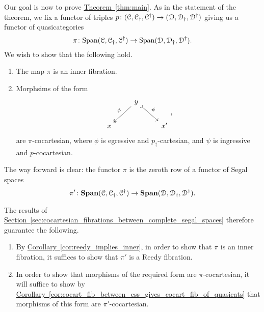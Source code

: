 \documentclass[main.tex]{subfiles}
\begin{document}
Our goal is now to prove \hyperref[thm:main]{Theorem~\ref*{thm:main}}. As in the statement of the theorem, we fix a functor of triples $p\colon (\mathcal{C}, \mathcal{C}_{\dagger}, \mathcal{C}^{\dagger}) \to (\mathcal{D}, \mathcal{D}_{\dagger}, \mathcal{D}^{\dagger})$ giving us a functor of quasicategories
\begin{equation*}
  \pi\colon \mathrm{Span}(\mathcal{C}, \mathcal{C}_{\dagger}, \mathcal{C}^{\dagger}) \to \mathrm{Span}(\mathcal{D}, \mathcal{D}_{\dagger}, \mathcal{D}^{\dagger}).
\end{equation*}
We wish to show that the following hold.
\begin{enumerate}
  \item The map $\pi$ is an inner fibration.

  \item Morphsims of the form
    \begin{equation}
      \label{eq:form_of_p_cocartesian_morphisms}
      \begin{tikzcd}
        & y
        \arrow[dl, two heads, swap, "\phi"]
        \arrow[dr, rightarrowtail, "\psi"]
        \\
        x
        && x'
      \end{tikzcd},
    \end{equation}
    are $\pi$-cocartesian, where $\phi$ is egressive and $p_{\dagger}$-cartesian, and $\psi$ is ingressive and $p$-cocartesian.
\end{enumerate}

The way forward is clear: the functor $\pi$ is the zeroth row of a functor of Segal spaces
\begin{equation*}
  \pi'\colon \mathbf{Span}(\mathcal{C}, \mathcal{C}_{\dagger}, \mathcal{C}^{\dagger}) \to \mathbf{Span}(\mathcal{D}, \mathcal{D}_{\dagger}, \mathcal{D}^{\dagger}).
\end{equation*}

The results of \hyperref[sec:cocartesian_fibrations_between_complete_segal_spaces]{Section~\ref*{sec:cocartesian_fibrations_between_complete_segal_spaces}} therefore guarantee the following.
\begin{enumerate}
  \item By \hyperref[cor:reedy_implies_inner]{Corollary~\ref*{cor:reedy_implies_inner}}, in order to show that $\pi$ is an inner fibration, it suffices to show that $\pi'$ is a Reedy fibration.

  \item In order to show that morphisms of the required form are $\pi$-cocartesian, it will suffice to show by \hyperref[cor:cocart_fib_between_css_gives_cocart_fib_of_quasicats]{Corollary~\ref*{cor:cocart_fib_between_css_gives_cocart_fib_of_quasicats}} that morphisms of this form are $\pi'$-cocartesian. 
\end{enumerate}
\end{document}

